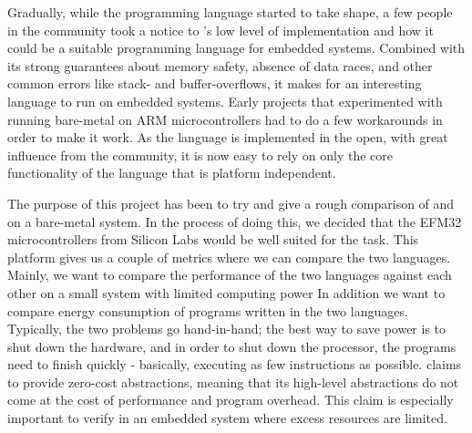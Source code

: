 Gradually, while the {\rust} programming language started to take shape, a few people in the community took a notice to {\rust}'s low level of implementation and how it could be a suitable programming language for embedded systems.
Combined with its strong guarantees about memory safety, absence of data races, and other common errors like stack- and buffer-overflows, it makes for an interesting language to run on embedded systems.
Early projects that experimented with running {\rust} bare-metal on ARM microcontrollers had to do a few workarounds in order to make it work.
As the language is implemented in the open, with great influence from the community, it is now easy to rely on only the core functionality of the language that is platform independent.

The purpose of this project has been to try and give a rough comparison of {\rust} and {\C} on a bare-metal system.
In the process of doing this, we decided that the EFM32 microcontrollers from Silicon Labs would be well suited for the task.
This platform gives us a couple of metrics where we can compare the two languages.
Mainly, we want to compare the performance of the two languages against each other on a small system with limited computing power
In addition we want to compare energy consumption of programs written in the two languages.
Typically, the two problems go hand-in-hand; the best way to save power is to shut down the hardware, and in order to shut down the processor, the programs need to finish quickly - basically, executing as few instructions as possible.
{\rust} claims to provide zero-cost abstractions, meaning that its high-level abstractions do not come at the cost of performance and program overhead.
This claim is especially important to verify in an embedded system where excess resources are limited.







